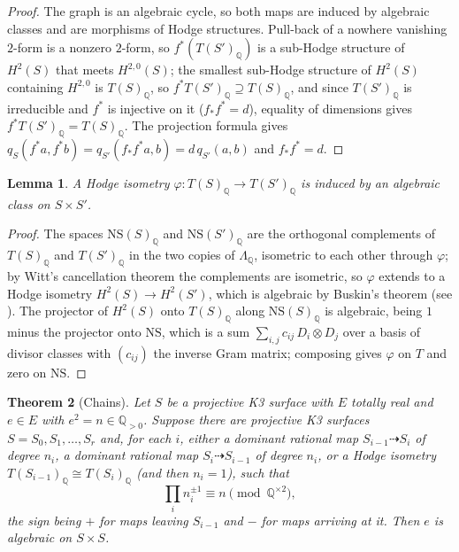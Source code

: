 \documentclass[11pt,reqno]{amsart}
\numberwithin{equation}{section}
\theoremstyle{plain}
\newtheorem{theorem}{Theorem}[section]
\newtheorem{lemma}[theorem]{Lemma}
\theoremstyle{definition}
\newcommand{\QQ}{\mathbb{Q}}
\newcommand{\NS}{\mathrm{NS}}
\begin{document}
\begin{proof}
The graph is an algebraic cycle, so both maps are induced by algebraic classes and are morphisms of Hodge structures. Pull-back of a nowhere vanishing $2$-form is a nonzero $2$-form, so $f^{*}(T(S')_{\QQ})$ is a sub-Hodge structure of $H^{2}(S)$ that meets $H^{2,0}(S)$; the smallest sub-Hodge structure of $H^{2}(S)$ containing $H^{2,0}$ is $T(S)_{\QQ}$, so $f^{*}T(S')_{\QQ}\supseteq T(S)_{\QQ}$, and since $T(S')_{\QQ}$ is irreducible and $f^{*}$ is injective on it ($f_{*}f^{*}=d$), equality of dimensions gives $f^{*}T(S')_{\QQ}=T(S)_{\QQ}$. The projection formula gives $q_{S}(f^{*}a,f^{*}b)=q_{S'}(f_{*}f^{*}a,b)=d\,q_{S'}(a,b)$ and $f_{*}f^{*}=d$.
\end{proof}

\begin{lemma}\label{lem:isometry}
A Hodge isometry $\varphi\colon T(S)_{\QQ}\to T(S')_{\QQ}$ is induced by an algebraic class on $S\times S'$.
\end{lemma}

\begin{proof}
The spaces $\NS(S)_{\QQ}$ and $\NS(S')_{\QQ}$ are the orthogonal complements of $T(S)_{\QQ}$ and $T(S')_{\QQ}$ in the two copies of $\Lambda_{\QQ}$, isometric to each other through $\varphi$; by Witt's cancellation theorem the complements are isometric, so $\varphi$ extends to a Hodge isometry $H^{2}(S)\to H^{2}(S')$, which is algebraic by Buskin's theorem \cite{Bus19} (see \cite[Thm.~0.1]{Huy19}). The projector of $H^{2}(S)$ onto $T(S)_{\QQ}$ along $\NS(S)_{\QQ}$ is algebraic, being $1$ minus the projector onto $\NS$, which is a sum $\sum_{i,j}c_{ij}\,D_{i}\otimes D_{j}$ over a basis of divisor classes with $(c_{ij})$ the inverse Gram matrix; composing gives $\varphi$ on $T$ and zero on $\NS$.
\end{proof}

\begin{theorem}[Chains]\label{thm:chain}
Let $S$ be a projective K3 surface with $E$ totally real and $e\in E$ with $e^{2}=n\in\QQ_{>0}$. Suppose there are projective K3 surfaces $S=S_{0},S_{1},\dots,S_{r}$ and, for each $i$, either a dominant rational map $S_{i-1}\dashrightarrow S_{i}$ of degree $n_{i}$, a dominant rational map $S_{i}\dashrightarrow S_{i-1}$ of degree $n_{i}$, or a Hodge isometry $T(S_{i-1})_{\QQ}\cong T(S_{i})_{\QQ}$ (and then $n_{i}=1$), such that
\[
\prod_{i}n_{i}^{\pm1}\equiv n\pmod{\QQ^{\times2}},
\]
the sign being $+$ for maps leaving $S_{i-1}$ and $-$ for maps arriving at it. Then $e$ is algebraic on $S\times S$.
\end{theorem}
\end{document}
